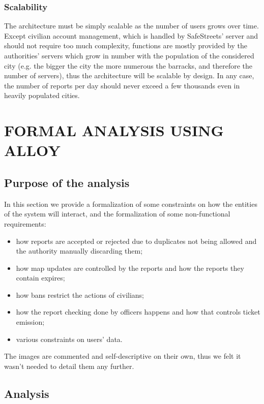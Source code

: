 \documentclass[12pt,a4paper]{article}
\begin{document}
\subsubsection{Scalability}
The architecture must be simply scalable as the number of users grows over time. Except civilian account management, which is handled by SafeStreets' server and should not require too much complexity, functions are mostly provided by the authorities' servers which grow in number with the population of the considered city (e.g. the bigger the city the more numerous the barracks, and therefore the number of servers), thus the architecture will be scalable by design. In any case, the number of reports per day should never exceed a few thousands even in heavily populated cities.
\newpage
\section{FORMAL ANALYSIS USING ALLOY}
\subsection{Purpose of the analysis}
In this section we provide a formalization of some constraints on how the entities of the system will interact, and the formalization of some non-functional requirements:
\begin{itemize}
 \item how reports are accepted or rejected due to duplicates not being allowed and the authority manually discarding them;
 \item how map updates are controlled by the reports and how the reports they contain expires;
 \item how bans restrict the actions of civilians;
 \item how the report checking done by officers happens and how that controls ticket emission;
 \item various constraints on users' data.
\end{itemize}
The images are commented and self-descriptive on their own, thus we felt it wasn't needed to detail them any further.
\newpage
\subsection{Analysis}
\end{document}
